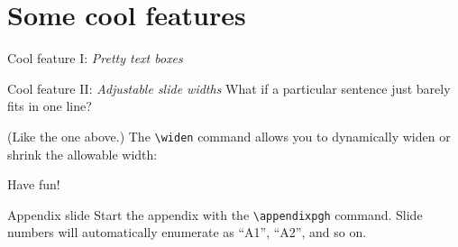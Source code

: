 \documentclass[14pt,aspectratio=169]{beamer}
\begin{document}
\section{Some cool features}

\begin{frame}{Cool feature I: \emph{Pretty text boxes}}
\end{frame}

\begin{frame}{Cool feature II: \emph{Adjustable slide widths}}
 What if a particular sentence just barely fits in one line?

(Like the one above.) The \texttt{\textbackslash widen} command allows you to dynamically widen or shrink the allowable width:

\end{frame}

\begin{frame}{}
\centering
Have fun!
\end{frame}


\appendixpgh


\begin{frame}{Appendix slide}
  Start the appendix with the \texttt{\textbackslash appendixpgh} command. Slide numbers will automatically enumerate as ``A1'', ``A2'', and so on.
\end{frame}
\end{document}
